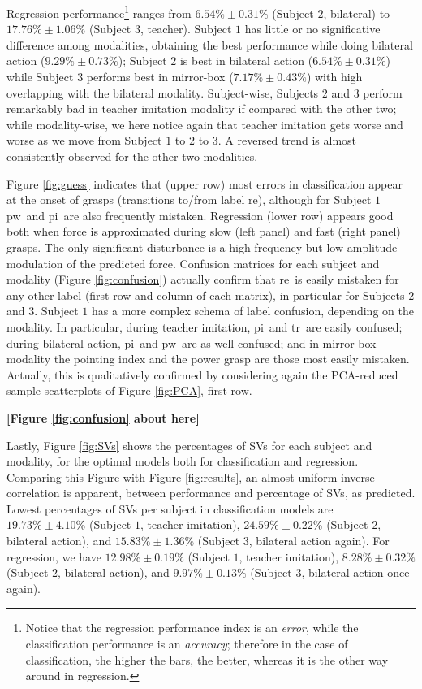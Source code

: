 \documentclass[review,authoryear]{elsarticle}
\def\re{\textsf{re}}
\def\pw{\textsf{pw}}
\def\pi{\textsf{pi}}
\def\tr{\textsf{tr}}
\begin{document}
Regression performance\footnote{Notice that the regression performance index
is an \emph{error}, while the classification performance is an \emph{accuracy};
therefore in the case of classification, the higher the bars, the better, whereas
it is the other way around in regression.} ranges from $6.54\% \pm 0.31\%$ (Subject $2$,
bilateral) to $17.76\% \pm 1.06\%$ (Subject $3$, teacher). Subject $1$ has
little or no significative difference among modalities, obtaining the best
performance while doing bilateral action ($9.29\% \pm 0.73\%$); Subject $2$
is best in bilateral action ($6.54\% \pm 0.31\%$) while Subject $3$ performs
best in mirror-box ($7.17\% \pm 0.43\%$) with high overlapping with the bilateral
modality. Subject-wise, Subjects $2$ and $3$ perform remarkably bad in teacher
imitation modality if compared with the other two; while modality-wise, we here
notice again that teacher imitation gets worse and worse as we move from Subject
$1$ to $2$ to $3$. A reversed trend is almost consistently observed for the other
two modalities.

Figure \ref{fig:guess} indicates that (upper row) most errors in classification
appear at the onset of grasps (transitions to/from label \re), although for Subject $1$
\pw\ and \pi\ are also frequently mistaken. Regression (lower row) appears good
both when force is approximated during slow (left panel) and fast (right panel)
grasps. The only significant disturbance is a high-frequency but low-amplitude
modulation of the predicted force. Confusion matrices for each subject and
modality (Figure \ref{fig:confusion}) actually confirm that \re\ is easily mistaken
for any other label (first row and column of each matrix), in particular for
Subjects $2$ and $3$. Subject $1$ has a more complex schema of label confusion,
depending on the modality. In particular, during teacher imitation, \pi\ and
\tr\ are easily confused; during bilateral action, \pi\ and \pw\ are as well
confused; and in mirror-box modality the pointing index and the power grasp
are those most easily mistaken. Actually, this is qualitatively confirmed by
considering again the PCA-reduced sample scatterplots of Figure \ref{fig:PCA},
first row.

\noindent \textbf{[Figure \ref{fig:confusion} about here]}

Lastly, Figure \ref{fig:SVs} shows the percentages of SVs for each
subject and modality, for the optimal models both for classification
and regression. Comparing this Figure with Figure \ref{fig:results},
an almost uniform inverse correlation is apparent,
between performance and percentage of SVs, as predicted.
Lowest percentages of SVs per subject in classification models are
$19.73\% \pm 4.10\%$ (Subject $1$, teacher imitation),
$24.59\% \pm 0.22\%$ (Subject $2$, bilateral action), and
$15.83\% \pm 1.36\%$ (Subject $3$, bilateral action again).
For regression, we have
$12.98\% \pm 0.19\%$ (Subject $1$, teacher imitation),
$8.28\% \pm 0.32\%$ (Subject $2$, bilateral action), and
$9.97\% \pm 0.13\%$ (Subject $3$, bilateral action once again).
\end{document}
